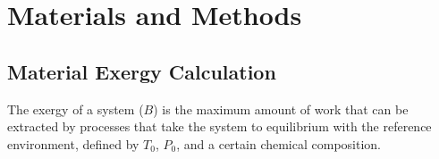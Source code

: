 \documentclass[energies,article,submit,pdftex,moreauthors]{Definitions/mdpi}
\begin{document}
\section{Materials and Methods}
\label{sec: materials and methods}

%
%
%
%

\subsection{Material Exergy Calculation}
\label{ssec: material exergy calculation}

The exergy of a system ($B$) is the maximum amount of work
that can be extracted
by processes that take the system
to equilibrium with the reference environment,
defined by $T_{0}$, $P_{0}$, and a certain chemical composition.\\
\end{document}
